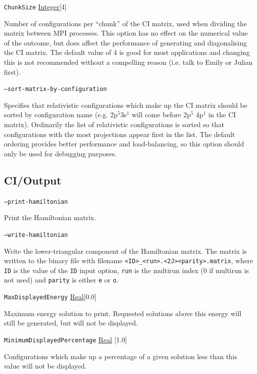 \documentclass{report}
\begin{document}
\texttt{ChunkSize} \uline{Integer}[4]
\begin{adjustwidth}{1cm}{}
Number of configurations per ``chunk'' of the CI matrix, used when dividing the matrix between MPI
processes. This option has no effect on the numerical 
value of the outcome, but does affect the performance of generating and diagonalising the CI matrix. 
The default value of 4 is good for most applications and changing this is not recommended without a 
compelling reason (i.e. talk to Emily or Julian first).
\end{adjustwidth}

\texttt{--sort-matrix-by-configuration}
\begin{adjustwidth}{1cm}{}
Specifies that relativistic configurations which make up the CI matrix should be sorted by configuration
name (e.g. 2p$^5$3s$^1$ will come before 2p$^5$ 4p$^1$ in the CI matrix). Ordinarily the list of
relativistic configurations is sorted so that configurations with the most projections appear first in
the list. The default ordering provides better performance and load-balancing, so this option should
only be used for debugging purposes.
\end{adjustwidth}

\subsection{CI/Output}

\texttt{--print-hamiltonian}
\begin{adjustwidth}{1cm}{}
Print the Hamiltonian matrix. 
\end{adjustwidth}

\texttt{--write-hamiltonian}
\begin{adjustwidth}{1cm}{}
Write the lower-triangular component of the Hamiltonian matrix. The matrix is written to the binary file
with filename \texttt{<ID>\_<run>.<2J><parity>.matrix}, where \texttt{ID} is the value of the 
\texttt{ID} input option, \texttt{run} is the multirun index (0 if multirun is not used) and
\texttt{parity} is either \texttt{e} or \texttt{o}.
\end{adjustwidth}

\texttt{MaxDisplayedEnergy} \uline{Real}[0.0]
\begin{adjustwidth}{1cm}{}
Maximum energy solution to print. Requested solutions above this energy will still be generated, but
will not be displayed.
\end{adjustwidth}

\texttt{MinimumDisplayedPercentage} \uline{Real} [1.0]
\begin{adjustwidth}{1cm}{}
Configurations which make up a percentage of a given solution less than this value will not be
displayed.
\end{adjustwidth}
\end{document}
